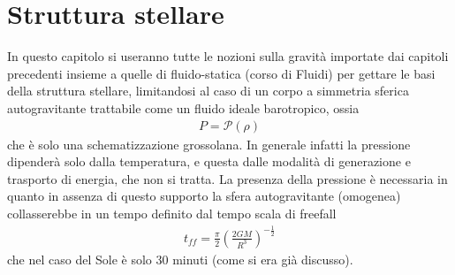 \documentclass[a4paper, oneside]{book}
\begin{document}
\chapter{Struttura stellare}
In questo capitolo si useranno tutte le nozioni sulla gravità importate dai 
capitoli precedenti insieme a quelle di fluido-statica (corso di Fluidi) per gettare le basi
della struttura stellare, limitandosi al caso di un corpo a simmetria sferica autogravitante
trattabile come un fluido ideale barotropico, ossia 
\begin{align}
    P = \mathcal{P}(\rho)
\end{align}
che è solo una schematizzazione grossolana.
In generale infatti la pressione dipenderà solo dalla temperatura, e questa dalle 
modalità di generazione e trasporto di energia, che non si tratta.
La presenza della pressione è necessaria in quanto in assenza di questo supporto
la sfera autogravitante (omogenea) collasserebbe in un tempo 
definito dal tempo scala di freefall 
\begin{align}
    t_{ff} = \frac{\pi}{2} \left(\frac{2GM}{R^{3}}\right)^{-\frac{1}{2}}
\end{align}
che nel caso del Sole è solo 30 minuti (come si era già discusso).
\end{document}
